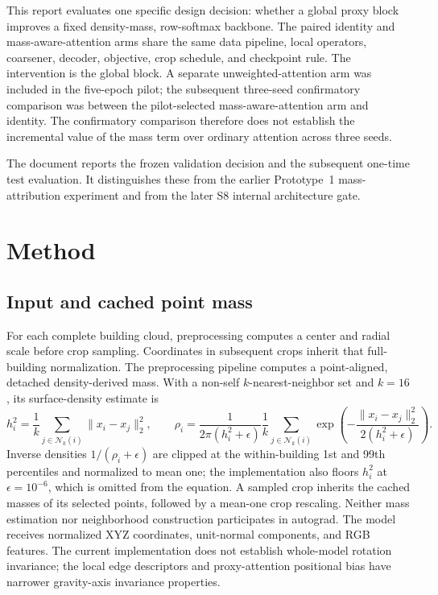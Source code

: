 \documentclass[11pt,a4paper]{article}
\begin{document}
This report evaluates one specific design decision: whether a global proxy block improves a fixed density-mass, row-softmax backbone. The paired identity and mass-aware-attention arms share the same data pipeline, local operators, coarsener, decoder, objective, crop schedule, and checkpoint rule. The intervention is the global block. A separate unweighted-attention arm was included in the five-epoch pilot; the subsequent three-seed confirmatory comparison was between the pilot-selected mass-aware-attention arm and identity. The confirmatory comparison therefore does not establish the incremental value of the mass term over ordinary attention across three seeds.

The document reports the frozen validation decision and the subsequent one-time test evaluation. It distinguishes these from the earlier Prototype~1 mass-attribution experiment and from the later S8 internal architecture gate.

\section{Method}

\subsection{Input and cached point mass}

For each complete building cloud, preprocessing computes a center and radial scale before crop sampling. Coordinates in subsequent crops inherit that full-building normalization. The preprocessing pipeline computes a point-aligned, detached density-derived mass. With a non-self $k$-nearest-neighbor set and $k=16$, its surface-density estimate is
\begin{equation}
 h_i^2=\frac{1}{k}\sum_{j\in\mathcal N_k(i)}\lVert x_i-x_j\rVert_2^2,
 \qquad
 \rho_i=\frac{1}{2\pi(h_i^2+\epsilon)}
 \frac{1}{k}\sum_{j\in\mathcal N_k(i)}
 \exp\!\left(-\frac{\lVert x_i-x_j\rVert_2^2}{2(h_i^2+\epsilon)}\right).
\end{equation}
Inverse densities $1/(\rho_i+\epsilon)$ are clipped at the within-building 1st and 99th percentiles and normalized to mean one; the implementation also floors $h_i^2$ at $\epsilon=10^{-6}$, which is omitted from the equation. A sampled crop inherits the cached masses of its selected points, followed by a mean-one crop rescaling. Neither mass estimation nor neighborhood construction participates in autograd. The model receives normalized XYZ coordinates, unit-normal components, and RGB features. The current implementation does not establish whole-model rotation invariance; the local edge descriptors and proxy-attention positional bias have narrower gravity-axis invariance properties.
\end{document}

